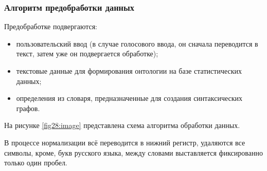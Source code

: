 \newpage

\subsubsection{Алгоритм предобработки данных}\label{sec:preprocess}
Предобработке подвергаются:
\begin{itemize}
	\item пользовательский ввод (в случае голосового ввода, он сначала переводится в текст, затем уже он подвергается обработке);
	\item текстовые данные для формирования онтологии на базе статистических данных;
	\item определения из словаря, предназначенные для создания синтаксических графов.
\end{itemize}

На рисунке \ref{fig28:image} представлена схема алгоритма обработки данных.

В процессе нормализации всё переводится в нижний регистр, удаляются все символы, кроме, букв русского языка, между словами выставляется фиксированно только один пробел.

